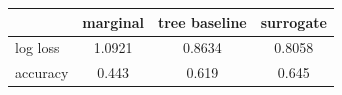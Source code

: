 \begin{tabular}{lccc}
\toprule
 & marginal & tree baseline & surrogate \\
\midrule
log loss & 1.0921 & 0.8634 & 0.8058 \\
accuracy & 0.443 & 0.619 & 0.645 \\
\bottomrule
\end{tabular}

